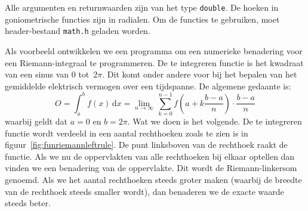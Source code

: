 Alle argumenten en returnwaarden zijn van het type \texttt{double}. De hoeken in goniometrische functies zijn in radialen. Om de functies te gebruiken, moet header-bestand \texttt{math.h} geladen worden.

Als voorbeeld ontwikkelen we een programma om een numerieke benadering voor een Riemann-integraal te programmeren. De te integreren functie is het kwadraat van een sinus van 0 tot~$2\pi$. Dit komt onder andere voor bij het bepalen van het gemiddelde elektrisch vermogen over een tijdspanne. De algemene gedaante is:
%
\begin{equation}
O = \int_{a}^{b}f(x)\,\mathrm{d}x = \lim\limits_{n\to\infty}\,\sum_{k=0}^{n-1}f\left(a+k\frac{b-a}{n}\right)\cdot\frac{b-a}{n}
\end{equation}
%
waarbij geldt dat $a=0$ en $b=2\pi$. Wat we doen is het volgende. De te integreren functie wordt verdeeld in een aantal rechthoeken zoals te zien is in figuur~\ref{fig:funriemannleftrule}. De punt linksboven van de rechthoek raakt de functie. Als we nu de oppervlakten van alle rechthoeken bij elkaar optellen dan vinden we een benadering van de oppervlakte. Dit wordt de Riemann-linkersom genoemd. Als we het aantal rechthoeken steeds groter maken (waarbij de breedte van de rechthoek steeds smaller wordt), dan benaderen we de exacte waarde steeds beter.

